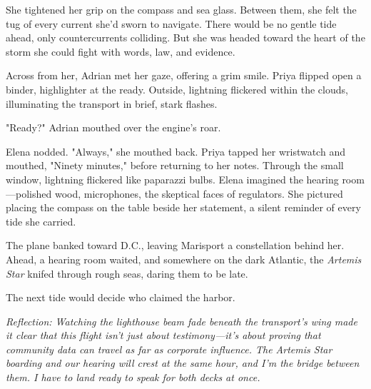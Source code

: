 She tightened her grip on the compass and sea glass. Between them, she felt the tug of every current she'd sworn to navigate. There would be no gentle tide ahead, only countercurrents colliding. But she was headed toward the heart of the storm she could fight with words, law, and evidence.

Across from her, Adrian met her gaze, offering a grim smile. Priya flipped open a binder, highlighter at the ready. Outside, lightning flickered within the clouds, illuminating the transport in brief, stark flashes.

"Ready?" Adrian mouthed over the engine's roar.

Elena nodded. "Always," she mouthed back. Priya tapped her wristwatch and mouthed, "Ninety minutes," before returning to her notes. Through the small window, lightning flickered like paparazzi bulbs. Elena imagined the hearing room—polished wood, microphones, the skeptical faces of regulators. She pictured placing the compass on the table beside her statement, a silent reminder of every tide she carried.

The plane banked toward D.C., leaving Marisport a constellation behind her. Ahead, a hearing room waited, and somewhere on the dark Atlantic, the \textit{Artemis Star} knifed through rough seas, daring them to be late.

The next tide would decide who claimed the harbor.

\noindent\textit{Reflection: Watching the lighthouse beam fade beneath the transport's wing made it clear that this flight isn't just about testimony—it's about proving that community data can travel as far as corporate influence. The \textit{Artemis Star} boarding and our hearing will crest at the same hour, and I'm the bridge between them. I have to land ready to speak for both decks at once.}
